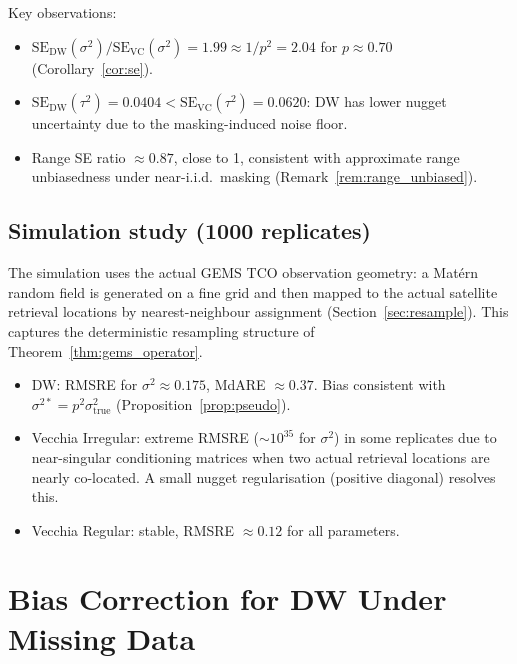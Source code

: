 \documentclass[12pt]{article}
\begin{document}
Key observations:
\begin{itemize}
  \item $\mathrm{SE}_{\mathrm{DW}}(\sigma^2)/\mathrm{SE}_{\mathrm{VC}}(\sigma^2)
        = 1.99 \approx 1/p^2 = 2.04$ for $p \approx 0.70$
        (Corollary~\ref{cor:se}).
  \item $\mathrm{SE}_{\mathrm{DW}}(\tau^2) = 0.0404 <
        \mathrm{SE}_{\mathrm{VC}}(\tau^2) = 0.0620$: DW has lower nugget
        uncertainty due to the masking-induced noise floor.
  \item Range SE ratio $\approx 0.87$, close to 1, consistent with
        approximate range unbiasedness under near-i.i.d.\ masking
        (Remark~\ref{rem:range_unbiased}).
\end{itemize}

\subsection{Simulation study (1000 replicates)}

The simulation uses the actual GEMS TCO observation geometry:
a Matérn random field is generated on a fine grid and then mapped to
the actual satellite retrieval locations by nearest-neighbour assignment
(Section~\ref{sec:resample}).
This captures the deterministic resampling structure of
Theorem~\ref{thm:gems_operator}.

\begin{itemize}
  \item DW: RMSRE for $\sigma^2 \approx 0.175$, MdARE $\approx 0.37$.
        Bias consistent with $\sigma^{2*} = p^2\sigma^2_{\mathrm{true}}$
        (Proposition~\ref{prop:pseudo}).
  \item Vecchia Irregular: extreme RMSRE ($\sim 10^{35}$ for $\sigma^2$)
        in some replicates due to near-singular conditioning matrices
        when two actual retrieval locations are nearly co-located.
        A small nugget regularisation (positive diagonal) resolves this.
  \item Vecchia Regular: stable, RMSRE $\approx 0.12$ for all parameters.
\end{itemize}


\section{Bias Correction for DW Under Missing Data}
\label{sec:bias}
\end{document}
